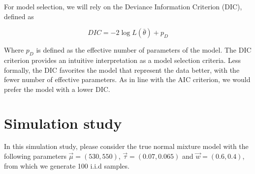 \documentclass{article}
\begin{document}
For model selection, we will rely on the Deviance Information Criterion (DIC), defined as

\begin{equation}
DIC = - 2 \log L(\bar{\theta}) + p_D
\end{equation}

Where $p_D$ is defined as the effective number of parameters of the model. The DIC criterion provides an intuitive interpretation as a model selection criteria. Less formally, the DIC favorites the model that represent the data better, with the fewer number of effective parameters. As in line with the AIC criterion, we would prefer the model with a lower DIC. %

\section{Simulation study}
In this simulation study, please consider the true normal mixture model with the following parameters $\vec \mu  = (530,550)$, $\vec \tau = (0.07, 0.065)$ and $\vec w = (0.6, 0.4)$, from which we generate 100 i.i.d samples.
\end{document}
